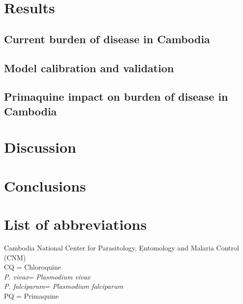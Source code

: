 \documentclass[doublespacing]{bmcart}
\newcommand{\pv}{\textit{P. vivax}}
\newcommand{\pf}{\textit{P. falciparum}}
\begin{document}
\section*{Results}

\subsection*{Current burden of disease in Cambodia}

\subsection*{Model calibration and validation}

\subsection*{Primaquine impact on burden of disease in Cambodia}

\section*{Discussion}

\section*{Conclusions}

\section*{List of abbreviations}
Cambodia National Center for Parasitology, Entomology and Malaria Control (CNM)\\
CQ = Chloroquine \\
\pv = \textit{Plasmodium vivax} \\
\pf = \textit{Plasmodium falciparum} \\
PQ = Primaquine \\
\end{document}
